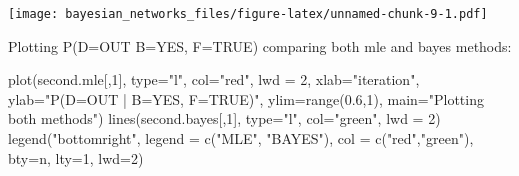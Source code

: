 \documentclass[
]{article}
\newenvironment{Shaded}{\begin{snugshade}}{\end{snugshade}}
\newcommand{\AttributeTok}[1]{\textcolor[rgb]{0.77,0.63,0.00}{#1}}
\newcommand{\CommentTok}[1]{\textcolor[rgb]{0.56,0.35,0.01}{\textit{#1}}}
\newcommand{\DecValTok}[1]{\textcolor[rgb]{0.00,0.00,0.81}{#1}}
\newcommand{\FloatTok}[1]{\textcolor[rgb]{0.00,0.00,0.81}{#1}}
\newcommand{\FunctionTok}[1]{\textcolor[rgb]{0.00,0.00,0.00}{#1}}
\newcommand{\NormalTok}[1]{#1}
\newcommand{\OtherTok}[1]{\textcolor[rgb]{0.56,0.35,0.01}{#1}}
\newcommand{\SpecialCharTok}[1]{\textcolor[rgb]{0.00,0.00,0.00}{#1}}
\newcommand{\StringTok}[1]{\textcolor[rgb]{0.31,0.60,0.02}{#1}}
\begin{document}
\begin{Shaded}
\end{Shaded}

\texttt{[image: bayesian\_networks\_files/figure-latex/unnamed-chunk-9-1.pdf]}

Plotting P(D=OUT \textbar{} B=YES, F=TRUE) comparing both mle and bayes methods:

\begin{Shaded}
\begin{Highlighting}[]
\FunctionTok{plot}\NormalTok{(second.mle[,}\DecValTok{1}\NormalTok{], }\AttributeTok{type=}\StringTok{"l"}\NormalTok{, }\AttributeTok{col=}\StringTok{"red"}\NormalTok{, }\AttributeTok{lwd =} \DecValTok{2}\NormalTok{, }\AttributeTok{xlab=}\StringTok{"iteration"}\NormalTok{, }\AttributeTok{ylab=}\StringTok{"P(D=OUT | B=YES, F=TRUE)"}\NormalTok{, }\AttributeTok{ylim=}\FunctionTok{range}\NormalTok{(}\FloatTok{0.6}\NormalTok{,}\DecValTok{1}\NormalTok{), }\AttributeTok{main=}\StringTok{"Plotting both methods"}\NormalTok{)}
\FunctionTok{lines}\NormalTok{(second.bayes[,}\DecValTok{1}\NormalTok{], }\AttributeTok{type=}\StringTok{"l"}\NormalTok{, }\AttributeTok{col=}\StringTok{"green"}\NormalTok{, }\AttributeTok{lwd =} \DecValTok{2}\NormalTok{)}
\FunctionTok{legend}\NormalTok{(}\StringTok{"bottomright"}\NormalTok{, }\AttributeTok{legend =} \FunctionTok{c}\NormalTok{(}\StringTok{"MLE"}\NormalTok{, }\StringTok{"BAYES"}\NormalTok{), }\AttributeTok{col =} \FunctionTok{c}\NormalTok{(}\StringTok{"red"}\NormalTok{,}\StringTok{"green"}\NormalTok{), }\AttributeTok{bty=}\StringTok{\textquotesingle{}n\textquotesingle{}}\NormalTok{, }\AttributeTok{lty=}\DecValTok{1}\NormalTok{, }\AttributeTok{lwd=}\DecValTok{2}\NormalTok{)}
\end{Highlighting}
\end{Shaded}
\end{document}
